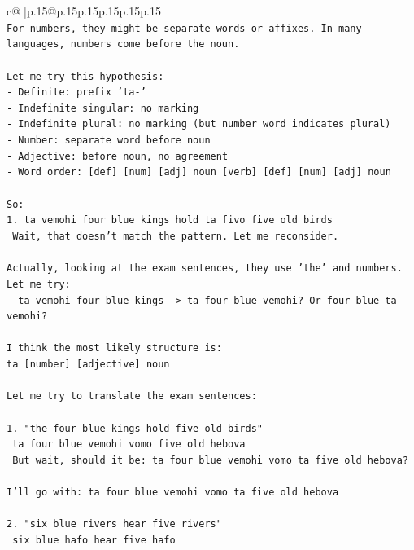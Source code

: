 \documentclass{article}
\begin{document}
{\begin{supertabular}{c@{$\;$}|p{.15\linewidth}@{}p{.15\linewidth}p{.15\linewidth}p{.15\linewidth}p{.15\linewidth}p{.15\linewidth}}
{{{\\ 
\texttt{For numbers, they might be separate words or affixes. In many languages, numbers come before the noun.} \\
\\ 
\texttt{Let me try this hypothesis:} \\
\texttt{{-} Definite: prefix 'ta{-}'} \\
\texttt{{-} Indefinite singular: no marking} \\
\texttt{{-} Indefinite plural: no marking (but number word indicates plural)} \\
\texttt{{-} Number: separate word before noun} \\
\texttt{{-} Adjective: before noun, no agreement} \\
\texttt{{-} Word order: {[}def{]} {[}num{]} {[}adj{]} noun {[}verb{]} {[}def{]} {[}num{]} {[}adj{]} noun} \\
\\ 
\texttt{So:} \\
\texttt{1. ta vemohi four blue kings hold ta fivo five old birds} \\
\texttt{   Wait, that doesn't match the pattern. Let me reconsider.} \\
\\ 
\texttt{Actually, looking at the exam sentences, they use 'the' and numbers. Let me try:} \\
\texttt{{-} ta vemohi four blue kings {-}> ta four blue vemohi? Or four blue ta vemohi?} \\
\\ 
\texttt{I think the most likely structure is:} \\
\texttt{ta {[}number{]} {[}adjective{]} noun} \\
\\ 
\texttt{Let me try to translate the exam sentences:} \\
\\ 
\texttt{1. "the four blue kings hold five old birds"} \\
\texttt{   ta four blue vemohi vomo five old hebova} \\
\texttt{   But wait, should it be: ta four blue vemohi vomo ta five old hebova?} \\
\\ 
\texttt{I'll go with: ta four blue vemohi vomo ta five old hebova} \\
\\ 
\texttt{2. "six blue rivers hear five rivers"} \\
\texttt{   six blue hafo hear five hafo} \\
}}}
\end{supertabular}}
\end{document}
